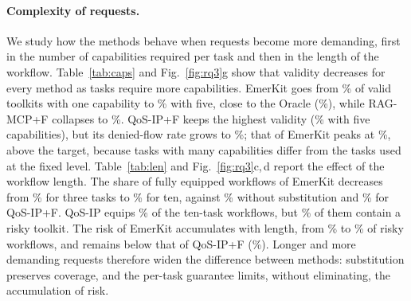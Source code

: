 \documentclass[10pt]{article}
\newcommand{\sysname}{EmerKit}
\begin{document}
\begin{table}[!ht]\centering
\caption{Effect of the number of capabilities required per task (rates in \%). Best deployable value in bold.}\label{tab:caps}
\scriptsize\setlength{\tabcolsep}{5pt}
\end{table}

\begin{table}[!ht]\centering
\caption{Effect of the workflow length, in tasks (rates in \%). Best value in bold.}\label{tab:len}
\scriptsize\setlength{\tabcolsep}{5pt}
\end{table}

\paragraph{Complexity of requests.} We study how the methods behave when requests become more demanding, first in the number of capabilities required per task and then in the length of the workflow. Table~\ref{tab:caps} and Fig.~\ref{fig:rq3}g show that validity decreases for every method as tasks require more capabilities. \sysname{} goes from \RXtwoEmkOne\% of valid toolkits with one capability to \RXtwoEmkFive\% with five, close to the Oracle (\RXtwoOraFive\%), while RAG-MCP+F collapses to \RXtwoRagFive\%. QoS-IP+F keeps the highest validity (\RXtwoZfFive\% with five capabilities), but its denied-flow rate grows to \RXtwoZfDfrFive\%; that of \sysname{} peaks at \RXtwoEmkDfrMax\%, above the target, because tasks with many capabilities differ from the tasks used at the fixed level. Table~\ref{tab:len} and Fig.~\ref{fig:rq3}c,\,d report the effect of the workflow length. The share of fully equipped workflows of \sysname{} decreases from \RXfourEmkThree\% for three tasks to \RXfourEmkTen\% for ten, against \RXfourNsTen\% without substitution and \RXfourZfTen\% for QoS-IP+F. QoS-IP equips \RXfourZTen\% of the ten-task workflows, but \RXfourZRiskTen\% of them contain a risky toolkit. The risk of \sysname{} accumulates with length, from \RXfourEmkRiskThree\% to \RXfourEmkRiskTen\% of risky workflows, and remains below that of QoS-IP+F (\RXfourZfRiskTen\%). Longer and more demanding requests therefore widen the difference between methods: substitution preserves coverage, and the per-task guarantee limits, without eliminating, the accumulation of risk.

\begin{table}[!ht]\centering
\caption{Exact and greedy composition by shortlist bound $N$ and capabilities per task $|R|$.}\label{tab:greedy}
\scriptsize\setlength{\tabcolsep}{3pt}
\end{table}
\end{document}
